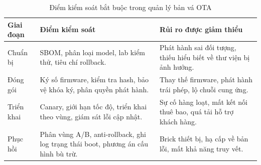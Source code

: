 \documentclass[../DoAn.tex]{subfiles}
\begin{document}
\begin{table}[H]
\centering
\begin{tabular}{|p{3.1cm}|p{4.5cm}|p{5.1cm}|}
\hline
\textbf{Giai đoạn} & \textbf{Điểm kiểm soát} & \textbf{Rủi ro được giảm thiểu} \\ \hline
Chuẩn bị & SBOM, phân loại model, lab kiểm thử, tiêu chí rollback. & Phát hành sai đối tượng, thiếu hiểu biết về thư viện bị ảnh hưởng. \\ \hline
Đóng gói & Ký số firmware, kiểm tra hash, bảo vệ khóa ký, phân quyền phát hành. & Thay thế firmware, phát hành trái phép, lộ chuỗi cung ứng. \\ \hline
Triển khai & Canary, giới hạn tốc độ, triển khai theo vùng, giám sát lỗi cập nhật. & Sự cố hàng loạt, mất kết nối thuê bao, quá tải hỗ trợ khách hàng. \\ \hline
Phục hồi & Phân vùng A/B, anti-rollback, ghi log trạng thái boot, phương án cấu hình bù trừ. & Brick thiết bị, hạ cấp về bản lỗi, mất khả năng truy vết. \\ \hline
\end{tabular}
\caption{Điểm kiểm soát bắt buộc trong quản lý bản vá OTA}
\label{tab:ota-controls}
\end{table}
\end{document}
